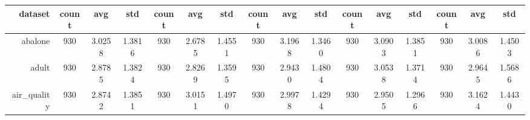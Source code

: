 \begin{table}[htbp]
{\begin{tabular}{rccccccccccccccc}
                  \cmidrule{2-16}    \textbf{dataset} & \textbf{count}                      & \textbf{avg}                                                              & \textbf{std}    & \textbf{count}                 & \textbf{avg}                                                                       & \textbf{std}    & \textbf{count}                  & \textbf{avg}                                                              & \textbf{std}    & \textbf{count}                  & \textbf{avg}                                                              & \textbf{std}    & \textbf{count}                  & \textbf{avg}    & \textbf{std}    \\
                  \midrule
                  abalone                             & 930                                 & 3.0258                                                                    & 1.3816          & 930                            & \cellcolor[rgb]{ .776,  .937,  .808}\textcolor[rgb]{ 0,  .38,  0}{2.6785}          & 1.4551          & 930                             & 3.1968                                                                    & 1.3460          & 930                             & 3.0903                                                                    & 1.3851          & 930                             & 3.0086          & 1.4503          \\
                  adult                               & 930                                 & 2.8785                                                                    & 1.3824          & 930                            & \cellcolor[rgb]{ .776,  .937,  .808}\textcolor[rgb]{ 0,  .38,  0}{2.8269}          & 1.3595          & 930                             & 2.9430                                                                    & 1.4804          & 930                             & 3.0538                                                                    & 1.3714          & 930                             & 2.9645          & 1.5686          \\
                  air\_quality                        & 930                                 & \cellcolor[rgb]{ .776,  .937,  .808}\textcolor[rgb]{ 0,  .38,  0}{2.8742} & 1.3851          & 930                            & 3.0151                                                                             & 1.4970          & 930                             & 2.9978                                                                    & 1.4294          & 930                             & 2.9505                                                                    & 1.2966          & 930                             & 3.1624          & 1.4430          \\

\end{tabular}}
\end{table}
